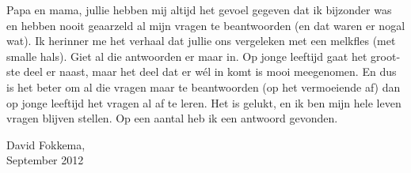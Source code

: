 \begin{otherlanguage}{dutch}
Papa en mama, jullie hebben mij altijd het gevoel gegeven dat ik bijzonder
was en hebben nooit geaarzeld al mijn vragen te beantwoorden (en dat waren
er nogal wat).  Ik herinner me het verhaal dat jullie ons vergeleken met
een melkfles (met smalle hals).  Giet al die antwoorden er maar in.  Op
jonge leeftijd gaat het grootste deel er naast, maar het deel dat er wél
in komt is mooi meegenomen.  En dus is het beter om al die vragen maar te
beantwoorden (op het vermoeiende af) dan op jonge leeftijd het vragen al
af te leren.  Het is gelukt, en ik ben mijn hele leven vragen blijven
stellen.  Op een aantal heb ik een antwoord gevonden.

\vfill


\vspace{1cm}
\flushright
David Fokkema,\\
September 2012

\end{otherlanguage}
